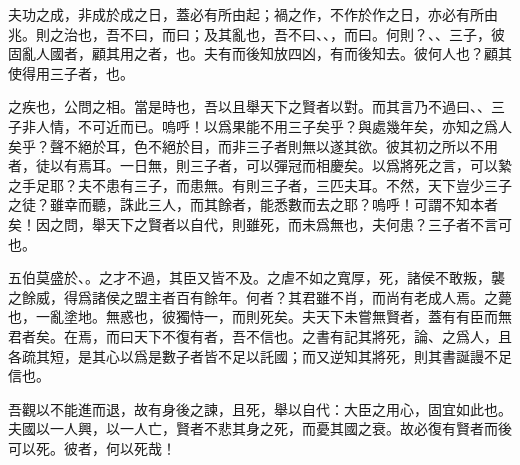 夫功之成，非成於成之日，蓋必有所由起；禍之作，不作於作之日，亦必有所由兆。{則}之治也，吾不曰，而曰；及其亂也，吾不曰、、，而曰。何則？、、三子，彼固亂人國者，顧其用之者，也。夫有而後知放四凶，有而後知去。彼何人也？顧其使得用三子者，也。

之疾也，公問之相。當是時也，吾以且舉天下之賢者以對。而其言乃不過曰、、三子非人情，不可近而已。嗚呼！以爲果能不用三子矣乎？與處幾年矣，亦知之爲人矣乎？聲不絕於耳，色不絕於目，而非三子者則無以遂其欲。彼其初之所以不用者，徒以有焉耳。一日無，則三子者，可以彈冠而相慶矣。以爲將死之言，可以縶之手足耶？夫不患有三子，而患無。有則三子者，三匹夫耳。不然，天下豈少三子之徒？雖幸而聽，誅此三人，而其餘者，能悉數而去之耶？嗚呼！可謂不知本者矣！因之問，舉天下之賢者以自代，則雖死，而未爲無也，夫何患？三子者不言可也。

五伯莫盛於、。之才不過，其臣又皆不及。之虐不如之寬厚，死，諸侯不敢叛，襲之餘威，得爲諸侯之盟主者百有餘年。何者？其君雖不肖，而尚有老成人焉。之薨也，一亂塗地。無惑也，彼獨恃一，而則死矣。夫天下未嘗無賢者，蓋有有臣而無君者矣。在焉，而曰天下不復有者，吾不信也。之書有記其將死，論、之爲人，且各疏其短，是其心以爲是數子者皆不足以託國；而又逆知其將死，則其書誕謾不足信也。

吾觀以不能進而退，故有身後之諫，且死，舉以自代：大臣之用心，固宜如此也。夫國以一人興，以一人亡，賢者不悲其身之死，而憂其國之衰。故必復有賢者而後可以死。彼者，何以死哉！
\nopagebreak
\theendnotes

